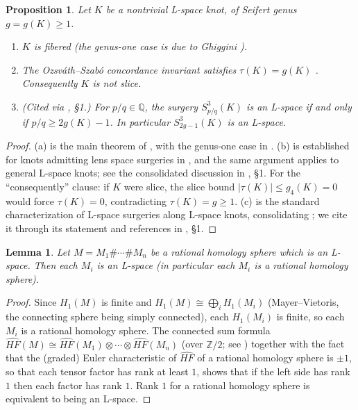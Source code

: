 \documentclass[11pt]{amsart}
\newtheorem{lemma}[theorem]{Lemma}
\newtheorem{proposition}[theorem]{Proposition}
\theoremstyle{definition}
\theoremstyle{remark}
\numberwithin{equation}{section}
\begin{document}
\begin{proposition}\label{prop:lspknot}
Let $K$ be a nontrivial L-space knot, of Seifert genus $g=g(K)\ge 1$.
\begin{enumerate}
\item[(a)] $K$ is fibered
\cite{Ni} (the genus-one case is due to Ghiggini \cite{Ghi}).
\item[(b)] The Ozsv\'ath--Szab\'o concordance invariant satisfies
$\tau(K)=g(K)$ \cite{OS3}. Consequently $K$ is not slice.
\item[(c)] \emph{(Cited via \cite{ORS}, \S1.)} For
$p/q\in\mathbb{Q}$, the surgery $S^{3}_{p/q}(K)$ is an L-space if and
only if $p/q\ge 2g(K)-1$. In particular $S^{3}_{2g-1}(K)$ is an
L-space.
\end{enumerate}
\end{proposition}

\begin{proof}
(a) is the main theorem of \cite{Ni}, with the genus-one case in
\cite{Ghi}. (b) is established for knots admitting lens space surgeries in
\cite{OS3}, and the same argument applies to general L-space knots; see
the consolidated discussion in \cite{ORS}, \S1. For the ``consequently''
clause: if $K$ were slice, the slice bound $|\tau(K)|\le g_{4}(K)=0$
\cite{OS2} would force $\tau(K)=0$, contradicting $\tau(K)=g\ge1$.
(c) is the standard characterization of L-space surgeries along L-space
knots, consolidating \cite{OS2,OS3}; we cite it through its statement and
references in \cite{ORS}, \S1.
\end{proof}

\begin{lemma}\label{lem:summands}
Let $M=M_{1}\#\cdots\#M_{n}$ be a rational homology sphere which is an
L-space. Then each $M_{i}$ is an L-space (in particular each $M_{i}$ is a
rational homology sphere).
\end{lemma}

\begin{proof}
Since $H_{1}(M)$ is finite and
$H_{1}(M)\cong\bigoplus_{i}H_{1}(M_{i})$ (Mayer--Vietoris, the connecting
sphere being simply connected), each $H_{1}(M_{i})$ is finite, so each
$M_{i}$ is a rational homology sphere. The connected sum formula
$\widehat{HF}(M)\cong\widehat{HF}(M_{1})\otimes\cdots\otimes
\widehat{HF}(M_{n})$ (over $\mathbb{Z}/2$; see \cite{OS1}) together with
the fact that the (graded) Euler characteristic of $\widehat{HF}$ of a
rational homology sphere is $\pm1$, so that each tensor factor has
rank at least $1$, shows that if the left side has rank $1$ then each
factor has rank $1$. Rank $1$ for a rational homology sphere is
equivalent to being an L-space.
\end{proof}
\end{document}
